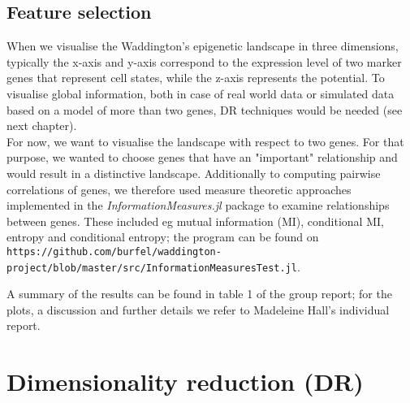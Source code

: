 \documentclass[journal, a4paper]{IEEEtran}
\begin{document}
\subsection{Feature selection}

When we visualise the Waddington's epigenetic landscape in three dimensions, typically the x-axis and y-axis correspond to the expression level of two marker genes that represent cell states, while the z-axis represents the potential. To visualise global information, both in case of real world data or simulated data based on a model of more than two genes, DR techniques would be needed (see next chapter).\\

For now, we want to visualise the landscape with respect to two genes. For that purpose, we wanted to choose genes that have an "important" relationship and would result in a distinctive landscape. 
Additionally to computing pairwise correlations of genes, we therefore used measure theoretic approaches implemented in the \textit{InformationMeasures.jl} package to examine relationships between genes. These included eg mutual information (MI), conditional MI,  entropy and conditional entropy; %
the program can be found on \texttt{https://github.com/burfel/waddington-project/blob/master/src/InformationMeasuresTest.jl}.

A summary of the results can be found in table 1 of the group report; for the plots, a discussion and further details we refer to Madeleine Hall's individual report.



\section{Dimensionality reduction (DR)}

\end{document}
